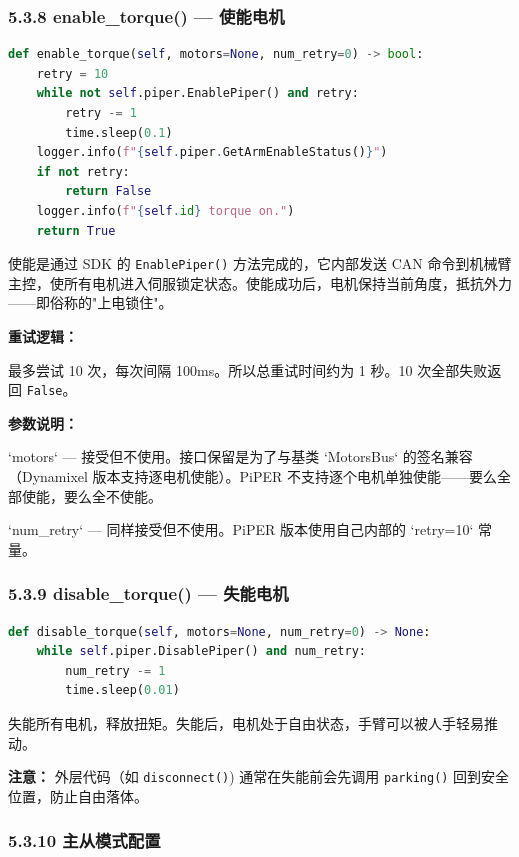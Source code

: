 \documentclass[UTF8,a4paper,11pt]{ctexart}
\begin{document}
{\subsubsection{5.3.8 enable_torque() — 使能电机}

\begin{lstlisting}[language=python]
def enable_torque(self, motors=None, num_retry=0) -> bool:
    retry = 10
    while not self.piper.EnablePiper() and retry:
        retry -= 1
        time.sleep(0.1)
    logger.info(f"{self.piper.GetArmEnableStatus()}")
    if not retry:
        return False
    logger.info(f"{self.id} torque on.")
    return True
\end{lstlisting}

使能是通过 SDK 的 \texttt{EnablePiper()} 方法完成的，它内部发送 CAN 命令到机械臂主控，使所有电机进入伺服锁定状态。使能成功后，电机保持当前角度，抵抗外力——即俗称的"上电锁住"。

\textbf{重试逻辑：}

最多尝试 10 次，每次间隔 100ms。所以总重试时间约为 1 秒。10 次全部失败返回 \texttt{False}。

\textbf{参数说明：}

\item `motors` — 接受但不使用。接口保留是为了与基类 `MotorsBus` 的签名兼容（Dynamixel 版本支持逐电机使能）。PiPER 不支持逐个电机单独使能——要么全部使能，要么全不使能。
\item `num_retry` — 同样接受但不使用。PiPER 版本使用自己内部的 `retry=10` 常量。

\subsubsection{5.3.9 disable_torque() — 失能电机}

\begin{lstlisting}[language=python]
def disable_torque(self, motors=None, num_retry=0) -> None:
    while self.piper.DisablePiper() and num_retry:
        num_retry -= 1
        time.sleep(0.01)
\end{lstlisting}

失能所有电机，释放扭矩。失能后，电机处于自由状态，手臂可以被人手轻易推动。

\textbf{注意：} 外层代码（如 \texttt{disconnect()}) 通常在失能前会先调用 \texttt{parking()} 回到安全位置，防止自由落体。

\subsubsection{5.3.10 主从模式配置}

}
\end{document}
